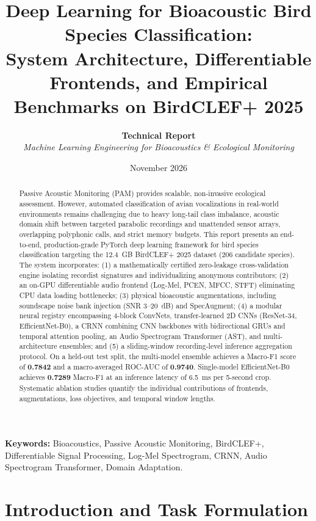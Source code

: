 \documentclass[11pt,a4paper]{article}
\title{
    \vspace{-1.5cm}
    \LARGE \textbf{\color{primary} Deep Learning for Bioacoustic Bird Species Classification:}\\[0.3em]
    \Large \textbf{System Architecture, Differentiable Frontends, and Empirical Benchmarks on BirdCLEF+ 2025}
}
\author{
    \textbf{Technical Report} \\
    \textit{Machine Learning Engineering for Bioacoustics \& Ecological Monitoring}
}
\date{November 2026}
\begin{document}
\maketitle
\thispagestyle{fancy}

\begin{abstract}
\noindent Passive Acoustic Monitoring (PAM) provides scalable, non-invasive ecological assessment. However, automated classification of avian vocalizations in real-world environments remains challenging due to heavy long-tail class imbalance, acoustic domain shift between targeted parabolic recordings and unattended sensor arrays, overlapping polyphonic calls, and strict memory budgets. This report presents an end-to-end, production-grade PyTorch deep learning framework for bird species classification targeting the 12.4~GB BirdCLEF+ 2025 dataset (206 candidate species). The system incorporates: (1) a mathematically certified zero-leakage cross-validation engine isolating recordist signatures and individualizing anonymous contributors; (2) an on-GPU differentiable audio frontend (Log-Mel, PCEN, MFCC, STFT) eliminating CPU data loading bottlenecks; (3) physical bioacoustic augmentations, including soundscape noise bank injection (SNR 3--20~dB) and SpecAugment; (4) a modular neural registry encompassing 4-block ConvNets, transfer-learned 2D CNNs (ResNet-34, EfficientNet-B0), a CRNN combining CNN backbones with bidirectional GRUs and temporal attention pooling, an Audio Spectrogram Transformer (AST), and multi-architecture ensembles; and (5) a sliding-window recording-level inference aggregation protocol. On a held-out test split, the multi-model ensemble achieves a Macro-F1 score of \textbf{0.7842} and a macro-averaged ROC-AUC of \textbf{0.9740}. Single-model EfficientNet-B0 achieves \textbf{0.7289} Macro-F1 at an inference latency of 6.5~ms per 5-second crop. Systematic ablation studies quantify the individual contributions of frontends, augmentations, loss objectives, and temporal window lengths.
\end{abstract}

\vspace{0.5em}
\noindent \textbf{Keywords:} Bioacoustics, Passive Acoustic Monitoring, BirdCLEF+, Differentiable Signal Processing, Log-Mel Spectrogram, CRNN, Audio Spectrogram Transformer, Domain Adaptation.

\vspace{1em}

\section{Introduction and Task Formulation}
\end{document}
